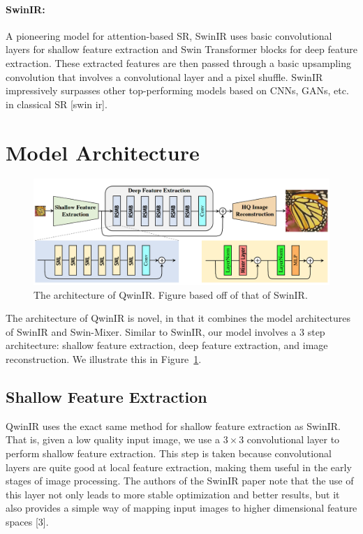 \documentclass{article}
\begin{document}
\paragraph{SwinIR:} A pioneering model for attention-based SR, SwinIR uses basic convolutional layers for shallow feature extraction and Swin Transformer blocks for deep feature extraction. These extracted features are then passed through a basic upsampling convolution that involves a convolutional layer and a pixel shuffle. SwinIR impressively surpasses other top-performing models based on CNNs, GANs, etc. in classical SR [swin ir].

\section{Model Architecture}

\begin{figure}\label{fig:architecture}
    \centering
    \includegraphics[width=\textwidth]{qwinir-architecture.png}
    \caption{The architecture of QwinIR. Figure based off of that of SwinIR.}
\end{figure}

The architecture of QwinIR is novel, in that it combines the model architectures of SwinIR and Swin-Mixer. Similar to SwinIR, our model involves a 3 step architecture: shallow feature extraction, deep feature extraction, and image reconstruction. We illustrate this in Figure~\ref{fig:architecture}.

\subsection{Shallow Feature Extraction}

QwinIR uses the exact same method for shallow feature extraction as SwinIR. That is, given a low quality input image, we use a $3 \times 3$ convolutional layer to perform shallow feature extraction. This step is taken because convolutional layers are quite good at local feature extraction, making them useful in the early stages of image processing. The authors of the SwinIR paper note that the use of this layer not only leads to more stable optimization and better results, but it also provides a simple way of mapping input images to higher dimensional feature spaces [3].
\end{document}
